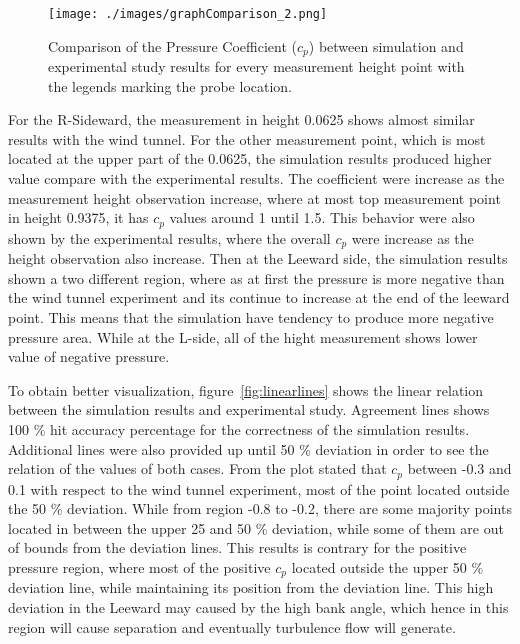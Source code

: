 \documentclass[12pt,a4paper]{cibb}
\begin{document}
\begin{figure}[h]
\vspace{1mm}
 \begin{center}
\texttt{[image: ./images/graphComparison\_2.png]}
\caption{
Comparison of the Pressure Coefficient ($c_p$) between simulation and experimental study results for every measurement height point with the legends marking the probe location.}
\label{fig:comparison1}
\end{center}
\end{figure}

For the R-Sideward, the measurement in height 0.0625 shows almost similar results with the wind tunnel. For the other measurement point, which is most located at the upper part of the 0.0625, the simulation results produced higher value compare with the experimental results. The coefficient were increase as the measurement height observation increase, where at most top measurement point in height 0.9375, it has $c_p$ values around 1 until 1.5. This behavior were also shown by the experimental results, where the overall $c_p$ were increase as the height observation also increase. Then at the Leeward side, the simulation results shown a two different region, where as at first the pressure is more negative than the wind tunnel experiment and its continue to increase at the end of the leeward point. This means that the simulation have tendency to produce more negative pressure area. While at the L-side, all of the hight measurement shows lower value of negative pressure. 

To obtain better visualization, figure~\ref{fig:linearlines} shows the linear relation between the simulation results and experimental study. Agreement lines shows 100 \% hit accuracy percentage for the correctness of the simulation results. Additional lines were also provided up until 50 \% deviation in order to see the relation of the values of both cases. From the plot stated that $c_p$ between -0.3 and 0.1 with respect to the wind tunnel experiment, most of the point located outside the 50 \% deviation. While from region -0.8 to -0.2, there are some majority points located in between the upper 25 and 50 \% deviation, while some of them are out of bounds from the deviation lines. This results is contrary for the positive pressure region, where most of the positive $c_p$ located outside the upper 50 \% deviation line, while maintaining its position from the deviation line. This high deviation in the Leeward may caused by the high bank angle, which hence in this region will cause separation and eventually turbulence flow will generate.
\end{document}
